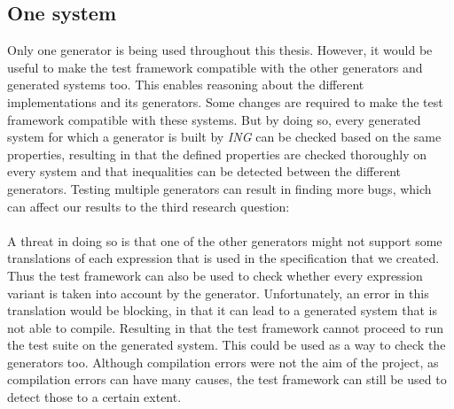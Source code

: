 \subsection*{One system}
Only one generator is being used throughout this thesis. However, it would be
useful to make the test framework compatible with the other generators and
generated systems too. This enables reasoning about the different
implementations and its generators. Some changes are required to make the test
framework compatible with these systems. But by doing so, every generated system
for which a generator is built by \textit{ING} can be checked based on the same
properties, resulting in that the defined properties are checked thoroughly on
every system and that inequalities can be detected between the different
generators. Testing multiple generators can result in finding more bugs, which can affect our results to the third research question:\rqThree\\
\\
A threat in doing so is that one of the other generators might not support some
translations of each expression that is used in the specification that we
created. Thus the test framework can also be used to check whether every
expression variant is taken into account by the generator. Unfortunately, an
error in this translation would be blocking, in that it can lead to a generated
system that is not able to compile. Resulting in that the test framework cannot
proceed to run the test suite on the generated system. This could be used as a
way to check the generators too. Although compilation errors were not the aim of
the project, as compilation errors can have many causes, the test framework can
still be used to detect those to a certain extent.

